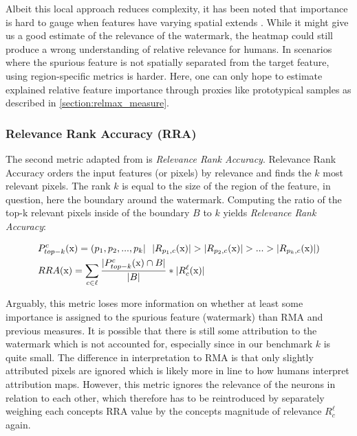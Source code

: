 Albeit this local approach reduces complexity, it has been noted that importance is hard to gauge when features have varying spatial extends \cite{Achtibat2022}. 
While it might give us a good estimate of the relevance of the watermark, the heatmap could still produce a wrong understanding of relative relevance for humans. 
In scenarios where the spurious feature is not spatially separated from the target feature, using region-specific metrics is harder. Here, one can only hope to estimate explained relative feature importance through proxies like prototypical samples as described in \cref{section:relmax_measure}.

\subsubsection{Relevance Rank Accuracy (RRA)}
The second metric adapted from \cite{Arras2022} is \textit{Relevance Rank Accuracy}.  
Relevance Rank Accuracy orders the input features (or pixels) by relevance and finds the $k$ most relevant pixels. The rank $k$ is equal to the size of the region of the feature, in question, here the boundary around the watermark. Computing the ratio of the top-k relevant pixels inside of the boundary $B$ to $k$ yields \textit{Relevance Rank Accuracy}:

\begin{align}
& P_{top-k}^{c}(\mathrm{x}) = (p_1, p_2,...,p_k | \ \  |R_{p_1,c}(\mathrm{x})| > |R_{p_2,c}(\mathrm{x})| > ... > |R_{p_k,c}(\mathrm{x})| ) \notag \\
& RRA(\mathrm{x}) = \sum_{c \in \ell} \frac{|P_{top-k}^{c}(\mathrm{x}) \cap B|}{|B|} * |R_c^{\ell}(\mathrm{x})|
\end{align}

Arguably, this metric loses more information on whether at least some importance is assigned to the spurious feature (watermark) than RMA and previous measures. It is possible that there is still some attribution to the watermark which is not accounted for, especially since in our benchmark $k$ is quite small. The difference in interpretation to RMA is that only slightly attributed pixels are ignored which is likely more in line to how humans interpret attribution maps. 
However, this metric ignores the relevance of the neurons in relation to each other, which therefore has to be reintroduced by separately weighing each concepts RRA value by the concepts magnitude of relevance $R_c^{\ell}$ again. 


